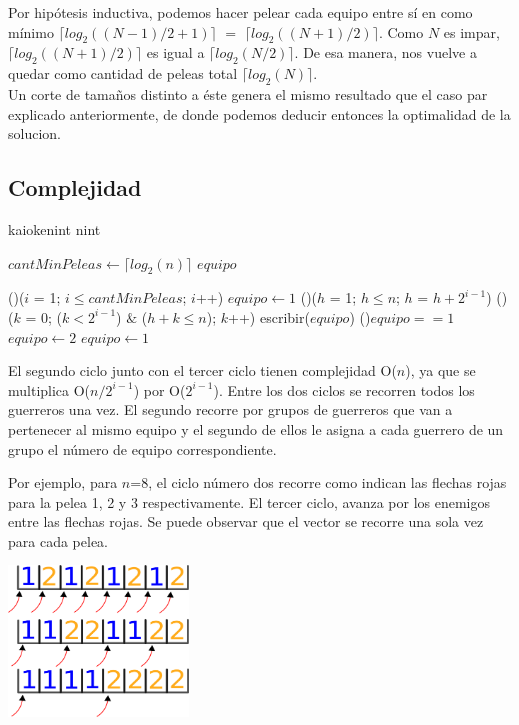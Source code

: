         

        Por hipótesis inductiva, podemos hacer pelear cada equipo entre sí en como mínimo $\lceil log_{2}((N-1)/2+1) \rceil$ $=$ $\lceil log_{2}((N+1)/2) \rceil$. Como $N$ es impar, $\lceil log_{2}((N+1)/2) \rceil$ es igual a $\lceil log_{2}(N/2) \rceil$. De esa manera, nos vuelve a quedar como cantidad de peleas total $\lceil log_{2}(N) \rceil$. \\

        Un corte de tamaños distinto a éste genera el mismo resultado que el caso par explicado anteriormente, de donde podemos deducir entonces la optimalidad de la solucion. \;






    \subsection{Complejidad}

    \begin{algoritmo}{kaioken}{int n}{int}

   $cantMinPeleas \gets \lceil log_{2}(n) \rceil$ 
   $equipo$ 

  \For(){($i$ = 1; $i \leq cantMinPeleas$; $i$++)}{
    $equipo \gets 1$ 
    \For(){($h$ = 1; $h \leq n$; $h$ = $h + 2^{i-1}$)}{
      \For(){($k$ = 0; ($k < 2^{i-1}$) $\&$ ($h+k \leq n$); $k$++)}{
        escribir($equipo$) 
      }
        \eIf(){$equipo == 1$}{
          $equipo \gets 2$ \;
        }{
          $equipo \gets 1$ \;
        }
    }
  }


\end{algoritmo}

El segundo ciclo junto con el tercer ciclo tienen complejidad O($n$), ya que se multiplica O($n/2^{i-1}$) por O($2^{i-1}$). Entre los dos ciclos se recorren todos los guerreros una vez. El segundo recorre por grupos de guerreros que van a pertenecer al mismo equipo y el segundo de ellos le asigna a cada guerrero de un grupo el número de equipo correspondiente. 

Por ejemplo, para $n$=8, el ciclo número dos recorre como indican las flechas rojas para la pelea 1, 2 y 3 respectivamente. El tercer ciclo, avanza por los enemigos entre las flechas rojas. Se puede observar que el vector se recorre una sola vez para cada pelea. 


\includegraphics[height=4cm]{graficos/ciclo.png}




